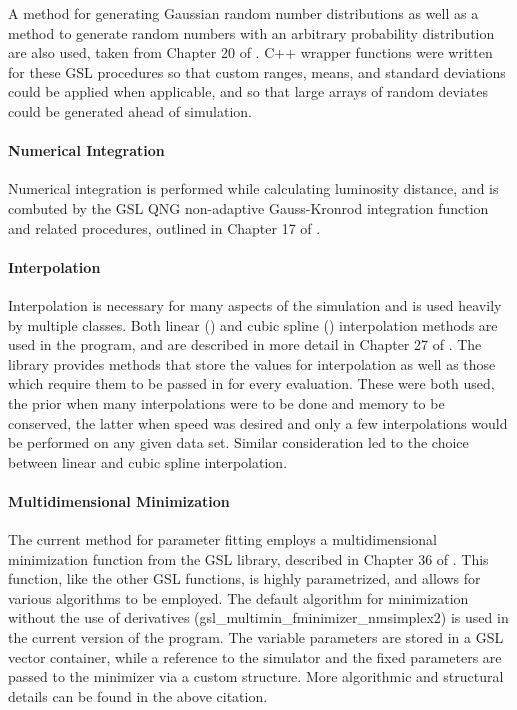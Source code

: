 \documentclass[twocolumn,letterpaper,10pt]{article}
\begin{document}
A method for generating Gaussian random number distributions as well as a method to generate random numbers with an arbitrary probability distribution are also used, taken from Chapter 20 of \citet{GSL}.  C++ wrapper functions were written for these GSL procedures so that custom ranges, means, and standard deviations could be applied when applicable, and so that large arrays of random deviates could be generated ahead of simulation.

\paragraph{Numerical Integration}

Numerical integration is performed while calculating luminosity distance, and is combuted by the GSL QNG non-adaptive Gauss-Kronrod integration function and related procedures, outlined in Chapter 17 of \citet{GSL}.

\paragraph{Interpolation}

Interpolation is necessary for many aspects of the simulation and is used heavily by multiple classes. Both linear ({}) and cubic spline ({}) interpolation methods are used in the program, and are described in more detail in Chapter 27 of \citet{GSL}. The library provides methods that store the values for interpolation as well as those which require them to be passed in for every evaluation. These were both used, the prior when many interpolations were to be done and memory to be conserved, the latter when speed was desired and only a few interpolations would be performed on any given data set. Similar consideration led to the choice between linear and cubic spline interpolation.

\paragraph{Multidimensional Minimization}

The current method for parameter fitting employs a multidimensional minimization function from the GSL library, described in Chapter 36 of \citet{GSL}. This function, like the other GSL functions, is highly parametrized, and allows for various algorithms to be employed. The default algorithm for minimization without the use of derivatives ({\sc gsl\_multimin\_fminimizer\_nmsimplex2}) is used in the current version of the program. The variable parameters are stored in a GSL vector container, while a reference to the simulator and the fixed parameters are passed to the minimizer via a custom structure. More algorithmic and structural details can be found in the above citation.
\end{document}

